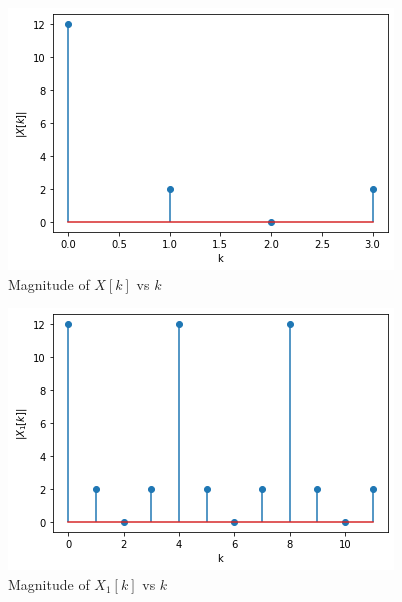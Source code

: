 \documentclass[journal,12pt,twocolumn]{IEEEtran}
\begin{document}
\begin{figure}[!ht]
    \centering
    \includegraphics[width=\columnwidth] {GATE_Fig_1.png}
    \caption{Magnitude of $X[k]$ vs $k$}
    \label{Magnitude of X[k]}
\end{figure}

\begin{figure}[!ht]
    \centering
    \includegraphics[width=\columnwidth] {GATE_Fig_2.png}
    \caption{Magnitude of $X_{1}[k]$ vs $k$}
    \label{Magnitude of X1[k]}
\end{figure}
\end{document}
